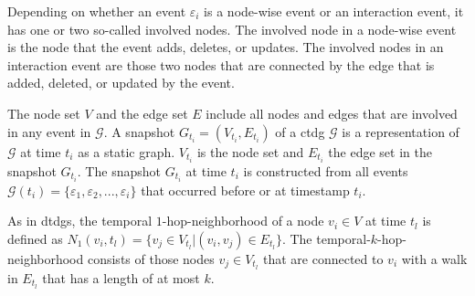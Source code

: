 Depending on whether an event $\varepsilon_i$ is a node-wise event or an interaction event, it has one or two so-called involved nodes. The involved node in a node-wise event is the node that the event adds, deletes, or updates. The involved nodes in an interaction event are those two nodes that are connected by the edge that is added, deleted, or updated by the event. 

The node set $V$ and the edge set $E$ include all nodes and edges that are involved in any event in $\mathcal{G}$. A snapshot $G_{t_i} = (V_{t_i}, E_{t_i})$ of a \gls{ctdg} $\mathcal{G}$ is a representation of $\mathcal{G}$ at time $t_i$ as a static graph. $V_{t_i}$ is the node set and $E_{t_i}$ the edge set in the snapshot $G_{t_i}$. The snapshot $G_{t_i}$ at time $t_i$ is constructed from all events $\mathcal{G}(t_i) = \{\varepsilon_1, \varepsilon_2, ..., \varepsilon_i\}$ that occurred before or at timestamp $t_i$.

\newpage


As in \glspl{dtdg}, the temporal $1$-hop-neighborhood of a node $v_i \in V$ at time $t_l$ is defined as $N_1(v_i, t_l) = \{v_j \in V_{t_l} | (v_i, v_j) \in E_{t_l}\}$. The temporal-$k$-hop-neighborhood consists of those nodes $v_j \in V_{t_l}$ that are connected to $v_i$ with a walk in $E_{t_l}$ that has a length of at most $k$.


